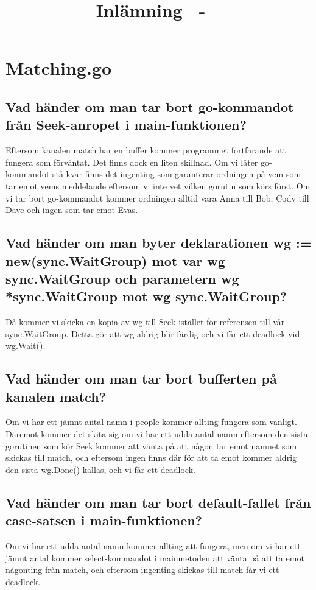 \documentclass[a4paper,10pt,twoside]{article}
\date{\thedate}
\author{\theauthor}
\title{Inlämning \homeworknumber\ - \course\ \coursename}
\begin{document}

\clearpage
\thispagestyle{empty}
\mbox{} %
\clearpage 

\setcounter{page}{1}
\section{Matching.go}
\subsection{Vad händer om man tar bort go-kommandot från Seek-anropet i main-funktionen?}
Eftersom kanalen match har en buffer kommer programmet fortfarande att fungera som förväntat. Det finns dock en liten skillnad. Om vi låter go-kommandot stå kvar finns det ingenting som garanterar ordningen på vem som tar emot vems meddelande eftersom vi inte vet vilken gorutin som körs först. Om vi tar bort go-kommandot kommer ordningen alltid vara Anna till Bob, Cody till Dave och ingen som tar emot Evas. 
\subsection{Vad händer om man byter deklarationen wg := new(sync.WaitGroup) mot var wg sync.WaitGroup och parametern wg *sync.WaitGroup mot wg sync.WaitGroup?}
Då kommer vi skicka en kopia av wg till Seek istället för referensen till vår sync.WaitGroup. Detta gör att wg aldrig blir färdig och vi får ett deadlock vid wg.Wait().
\subsection{Vad händer om man tar bort bufferten på kanalen match?}
Om vi har ett jämnt antal namn i people kommer allting fungera som vanligt. Däremot kommer det skita sig om vi har ett udda antal namn eftersom den sista gorutinen som kör Seek kommer att vänta på att någon tar emot namnet som skickas till match, och eftersom ingen finns där för att ta emot kommer aldrig den sista wg.Done() kallas, och vi får ett deadlock.
\subsection{Vad händer om man tar bort default-fallet från case-satsen i main-funktionen?}
Om vi har ett udda antal namn kommer allting att fungera, men om vi har ett jämnt antal kommer select-kommandot i mainmetoden att vänta på att ta emot någonting från match, och eftersom ingenting skickas till match får vi ett deadlock.
\end{document}
